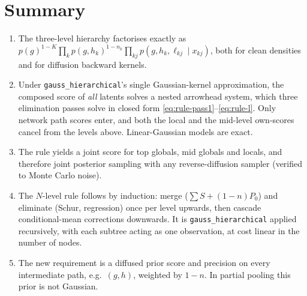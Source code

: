 \documentclass[11pt]{article}
\theoremstyle{definition}
\theoremstyle{remark}
\newcommand{\arrowm}{\texttt{gauss\_\allowbreak hierarchical}}
\newcommand{\hk}{h_k}
\newcommand{\lkj}{\ell_{kj}}
\begin{document}
\section{Summary}
\begin{enumerate}
\item The three-level hierarchy factorises exactly as
 $p(g)^{1-K}\prod_kp(g,\hk)^{1-n_k}\prod_{kj}p(g,\hk,\lkj\mid x_{kj})$, both for
 clean densities and for diffusion backward kernels.
\item Under \arrowm's single Gaussian-kernel approximation, the composed score of
 \emph{all} latents solves a nested arrowhead system, which three elimination
 passes solve in closed form \eqref{eq:rule-pass1}--\eqref{eq:rule-l}. Only network
 path scores enter, and both the local and the mid-level own-scores cancel from the
 levels above. Linear-Gaussian models are exact.
\item The rule yields a joint score for top globals, mid globals and locals, and
 therefore joint posterior sampling with any reverse-diffusion sampler (verified
 to Monte Carlo noise).
\item The $N$-level rule follows by induction: merge
 ($\sum S+(1-n)P_0$) and eliminate (Schur, regression) once per level upwards,
 then cascade conditional-mean corrections downwards. It is \arrowm{} applied
 recursively, with each subtree acting as one observation, at cost linear in the
 number of nodes.
\item The new requirement is a diffused prior score and precision on every
 intermediate path, e.g.\ $(g,h)$, weighted by $1-n$. In partial pooling this
 prior is not Gaussian.
\end{enumerate}
\end{document}
